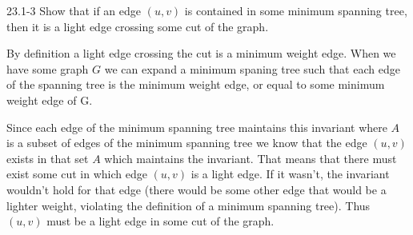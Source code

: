 




\homeworkheader{\classnameandsection}

\begin{problem}{23.1-3}
  Show that if an edge $(u,v)$ is contained in some minimum spanning tree, then it is a light edge crossing some cut of
  the graph.
  \begin{solution}
    By definition a light edge crossing the cut is a minimum weight edge. When we have some graph $G$ we can expand a
    minimum spaning tree such that each edge of the spanning tree is the minimum weight edge, or equal to some minimum
    weight edge of G.

    Since each edge of the minimum spanning tree maintains this invariant where $A$ is a subset of edges of the minimum
    spanning tree we know that the edge $(u,v)$ exists in that set $A$ which maintains the invariant. That means that
    there must exist some cut in which edge $(u,v)$ is a light edge. If it wasn't, the invariant wouldn't hold for that
    edge (there would be some other edge that would be a lighter weight, violating the definition of a minimum spanning
    tree).  Thus $(u,v)$ must be a light edge in some cut of the graph.
  \end{solution}
\end{problem}

